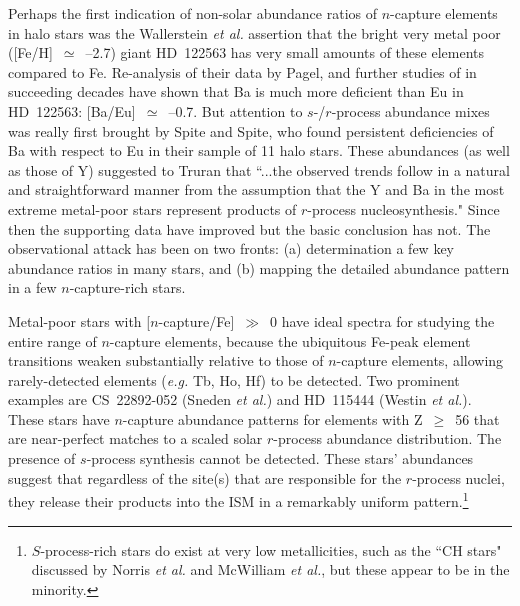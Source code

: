                                                                                                                                                                                                                                                                                                                                                                                                                                                                                                                                                                                                                                                                                                                                                                                                                                                                                                                                                                                                                                                                                                                                                                                                                                                                                                                                                                                                                                                                                                                                                                                                                                                                                                                                                                                                                                                                                                                                                                                                                                                                                                                                                                                                                                                                                                                                                                                                                                                                                                                                                                                                                                                                                                                                                                                                                                                                                                                                                                                                                                                                                                                                                                                                                                                                                                                                                                                                                                                                                                                                                                                                                                                                                                                                                                                                                                                                                                                                                                                                                                                                                                                                                                                                                                                                                                                                                                                                                                                                                                                                                                                                                                                                                                                                                                                                                                                                                                                                                                                                                                                                                                                                                                                                                                                                                                                                                                                                                                                                                                                                                                                                                                                                                                                                                                                                                                                                                                                                                                                                                                                                                                                                                                                                                                                                                                                                                                                                                                                                                                                                                                                                                                                                                                                                                                                                                                                                                                                                                                                                                                                                                                                                                                                                                                                                                                                                                                                                                                                                                                                                                                                                                                                                                                                                                                                                                                                                                                                                                                                                                                                                                                                                                                                                                                                                                                                                                                                                                                                                                                                                                                                                                                                                                                                                                                                                                                                                                                                                                                                                                                                                                                                                                                                                                                                                                                                                                                                                                                                                                                                                                                                                                                                                                                                                                                                                                                                                                                                                                                                                                                                                                                                                                                                                                                                                                                                                                                                                                                                                                                                                                                                                                                                                                                                                                                                                                                                                                                                                                                                                                                                                                                                                                                                                                                                                                                                                                                                                                                                                                                                                                                                                                                                                                                                                                                                                                                                                                                                                                                                                                                                                                                                                                                                                                                                                                                                                                                                                                                                                                                                                                                                                                                                                                                                                                                                                                                                                                                                                                                                                                                                                                                                                                                                                                                                                                                                                                                                                                                                                                                                                                                                                                                                                                                                                                                                                                                                                                                                                                                                                                                                                                                                                                                                                                                                                                                                                                                                                                                                                                                                                                                                                                                                                                                                                                                                                                                                                                                                                                                                                                                                                                                                                                                                                                                                                                                                                                                                                                                                                                                                                                                                                                                                                                                                                                                                            \documentclass{ws-p8-50x6-00}
\begin{document}
Perhaps the first indication of non-solar abundance ratios of $n$-capture
elements in halo stars was the Wallerstein {\it et al.}\cite{Wa63} assertion
that the bright very metal poor ([Fe/H]~$\simeq$~--2.7) giant HD~122563 
has very small amounts of these elements compared to Fe.
Re-analysis of their data by Pagel\cite{Pa65}, and further studies of
in succeeding decades have shown that Ba is much more deficient than Eu 
in HD~122563: [Ba/Eu]~$\simeq$~--0.7.  
But attention to $s$-/$r$-process abundance mixes was really first 
brought by Spite and Spite\cite{SS78}, who found persistent deficiencies of 
Ba with respect to Eu in their sample of 11 halo stars.  
These abundances (as well as those of Y) suggested to Truran\cite{Tr81}
that ``...the observed trends follow in a natural and straightforward 
manner from the assumption that the Y and Ba in the most extreme metal-poor 
stars represent products of $r$-process nucleosynthesis."  
Since then the supporting data have improved but the basic conclusion has not.  
The observational attack has been on two fronts: (a) determination a few 
key abundance ratios in many stars, and (b) mapping the detailed 
abundance pattern in a few $n$-capture-rich stars.
 
Metal-poor stars with [$n$-capture/Fe]~$\gg$~0 have ideal spectra for
studying the entire range of $n$-capture elements, because the ubiquitous 
Fe-peak element transitions weaken substantially relative to those of
$n$-capture elements, allowing rarely-detected elements ({\it e.g.} Tb, Ho,
Hf) to be detected.  
Two prominent examples are CS~22892-052 (Sneden {\it et al.}\cite{Sn00}) and 
HD~115444 (Westin {\it et al.}\cite{We00}).  
These stars have $n$-capture abundance patterns for elements with 
Z~$\geq$~56 that are near-perfect matches to a scaled solar $r$-process 
abundance distribution.  
The presence of $s$-process synthesis cannot be detected.  
These stars' abundances suggest that regardless of the site(s) 
that are responsible for the $r$-process nuclei, they release their 
products into the ISM in a remarkably uniform pattern.\footnote{
$S$-process-rich stars do exist at very low metallicities, such as the 
``CH stars" discussed by Norris {\it et al.}\cite{No97} and McWilliam 
{\it et al.}\cite{Mc95}, but these appear to be in the minority.}
 
\end{document}
